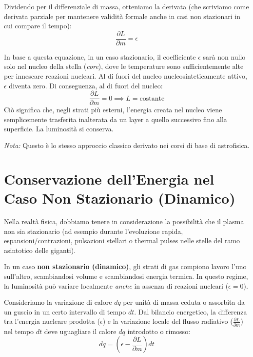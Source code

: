 Dividendo per il differenziale di massa, otteniamo la derivata (che scriviamo come derivata parziale per mantenere validità formale anche in casi non stazionari in cui compare il tempo):
\begin{equation}
\frac{\partial L}{\partial m} = \epsilon
\end{equation}

In base a questa equazione, in un caso stazionario, il coefficiente $\epsilon$ sarà non nullo solo nel nucleo della stella (\textit{core}), dove le temperature sono sufficientemente alte per innescare reazioni nucleari. Al di fuori del nucleo nucleosinteticamente attivo, $\epsilon$ diventa zero.
Di conseguenza, al di fuori del nucleo:
\begin{equation}
\frac{\partial L}{\partial m} = 0 \implies L = \text{costante}
\end{equation}
Ciò significa che, negli strati più esterni, l'energia creata nel nucleo viene semplicemente trasferita inalterata da un layer a quello successivo fino alla superficie. La luminosità si conserva.

\textit{Nota:} Questo è lo stesso approccio classico derivato nei corsi di base di astrofisica.

\section{Conservazione dell'Energia nel Caso Non Stazionario (Dinamico)}

Nella realtà fisica, dobbiamo tenere in considerazione la possibilità che il plasma non sia stazionario (ad esempio durante l'evoluzione rapida, espansioni/contrazioni, pulsazioni stellari o thermal pulses nelle stelle del ramo asintotico delle giganti).

In un caso \textbf{non stazionario (dinamico)}, gli strati di gas compiono lavoro l'uno sull'altro, scambiandosi volume e scambiandosi energia termica. In questo regime, la luminosità può variare localmente \textit{anche} in assenza di reazioni nucleari ($\epsilon = 0$).

Consideriamo la variazione di calore $dq$ per unità di massa ceduta o assorbita da un guscio in un certo intervallo di tempo $dt$. Dal bilancio energetico, la differenza tra l'energia nucleare prodotta ($\epsilon$) e la variazione locale del flusso radiativo ($\frac{\partial L}{\partial m}$) nel tempo $dt$ deve uguagliare il calore $dq$ introdotto o rimosso:
\begin{equation}
dq = \left( \epsilon - \frac{\partial L}{\partial m} \right) dt
\end{equation}

